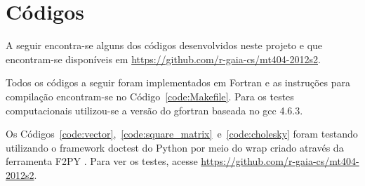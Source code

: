 \documentclass[12pt,a4paper]{article}
\begin{document}
\section{C\'{o}digos}
A seguir encontra-se alguns dos c\'{o}digos desenvolvidos neste projeto e que
encontram-se disponíveis em \url{https://github.com/r-gaia-cs/mt404-2012s2}.

Todos os c\'{o}digos a seguir foram implementados em Fortran e as instruções
para compilação encontram-se no Código~\ref{code:Makefile}. Para os testes
computacionais utilizou-se a versão do gfortran baseada no gcc 4.6.3.

Os Códigos~\ref{code:vector},~\ref{code:square_matrix}~e~\ref{code:cholesky}
foram testando utilizando o framework doctest do Python por meio do wrap criado
através da ferramenta F2PY \cite{Scipy}. Para ver os testes, acesse
\url{https://github.com/r-gaia-cs/mt404-2012s2}.








\end{document}
